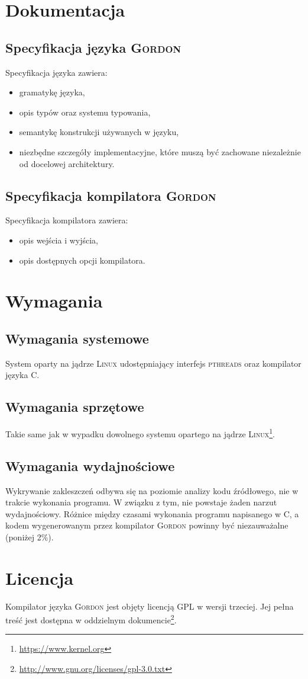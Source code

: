 \documentclass{documentation}
\begin{document}
\section{Dokumentacja}
\subsection{Specyfikacja języka \textsc{Gordon}}
\noindent Specyfikacja języka zawiera:
\begin{itemize}
\item gramatykę języka,
\item opis typów oraz systemu typowania,
\item semantykę konstrukcji używanych w języku,
\item niezbędne szczegóły implementacyjne, które muszą być zachowane niezależnie od docelowej architektury.
\end{itemize}

\subsection{Specyfikacja kompilatora \textsc{Gordon}}
\noindent Specyfikacja kompilatora zawiera:
\begin{itemize}
\item opis wejścia i wyjścia,
\item opis dostępnych opcji kompilatora.
\end{itemize}

\section{Wymagania}
\subsection{Wymagania systemowe}
\noindent System oparty na jądrze \textsc{Linux} udostępniający interfejs \textsc{pthreads} oraz kompilator języka C.

\subsection{Wymagania sprzętowe}
\noindent Takie same jak w wypadku dowolnego systemu opartego na jądrze
\textsc{Linux}\footnote{\url{https://www.kernel.org}}.

\subsection{Wymagania wydajnościowe}
\noindent Wykrywanie zakleszczeń odbywa się na poziomie analizy kodu źródłowego, nie w trakcie wykonania programu. W związku z tym, nie powstaje żaden narzut wydajnościowy. Różnice między czasami wykonania programu napisanego w C, a kodem wygenerowanym przez kompilator \textsc{Gordon} powinny być niezauważalne (poniżej 2\%).

\section{Licencja}
\noindent Kompilator języka \textsc{Gordon} jest objęty licencją GPL w wersji trzeciej. Jej pełna treść jest dostępna w oddzielnym dokumencie\footnote{\url{http://www.gnu.org/licenses/gpl-3.0.txt}}.
\end{document}
